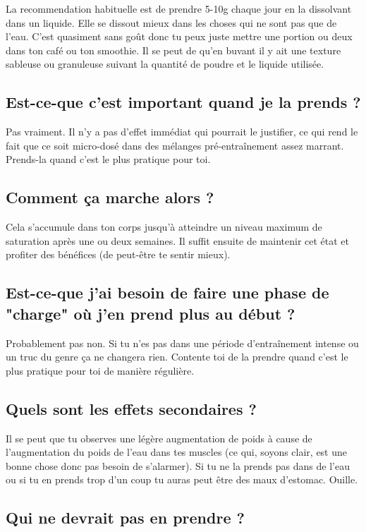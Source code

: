 \documentclass{article}
\begin{document}
La recommendation habituelle est de prendre 5-10g chaque jour en la dissolvant dans un liquide. Elle se dissout mieux dans les choses qui ne sont pas que de l'eau. C'est quasiment sans goût donc tu peux juste mettre une portion ou deux dans ton café ou ton smoothie. Il se peut de qu'en buvant il y ait une texture sableuse ou granuleuse suivant la quantité de poudre et le liquide utilisée. 

\subsection{Est-ce-que c'est important quand je la prends ?}

Pas vraiment. Il n'y a pas d'effet immédiat qui pourrait le justifier, ce qui rend le fait que ce soit micro-dosé dans des mélanges pré-entraînement assez marrant. Prends-la quand c'est le plus pratique pour toi.

\subsection{Comment ça marche alors ?}

Cela s'accumule dans ton corps jusqu'à atteindre un niveau maximum de saturation après une ou deux semaines. Il suffit ensuite de maintenir cet état et profiter des bénéfices (de peut-être te sentir mieux).

\subsection{Est-ce-que j'ai besoin de faire une phase de "charge" où j'en prend plus au début ?}

Probablement pas non. Si tu n'es pas dans une période d'entraînement intense ou un truc du genre ça ne changera rien. Contente toi de la prendre quand c'est le plus pratique pour toi de manière régulière.

\subsection{Quels sont les effets secondaires ?}

Il se peut que tu observes une légère augmentation de poids à cause de l'augmentation du poids de l'eau dans tes muscles (ce qui, soyons clair, est une bonne chose donc pas besoin de s'alarmer). Si tu ne la prends pas dans de l'eau ou si tu en prends trop d'un coup tu auras peut être des maux d'estomac. Ouille.

\subsection{Qui ne devrait pas en prendre ?}
\end{document}
